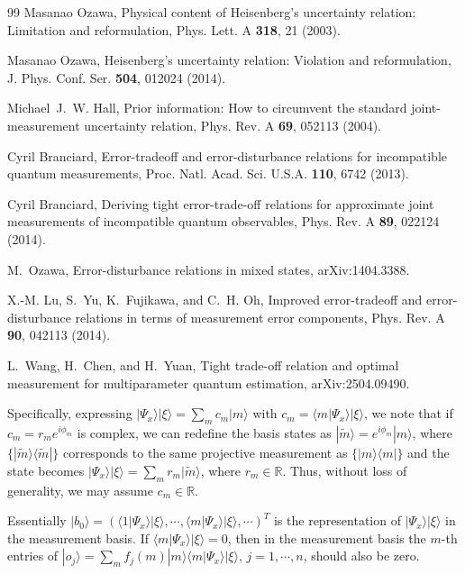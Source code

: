 \documentclass[
aps,
prl,
twocolumn,

superscriptaddress]{revtex4-2}
\newcommand{\ket}[1]{|#1\rangle}
\newcommand{\bra}[1]{\langle #1|}
\begin{document}
\begin{thebibliography}{99}
Masanao Ozawa, Physical content of Heisenberg's uncertainty relation:
Limitation and reformulation, Phys. Lett. A \textbf{318}, 21 (2003).

Masanao Ozawa, Heisenberg's uncertainty relation: Violation and reformulation,
J. Phys. Conf. Ser. \textbf{504}, 012024 (2014).

Michael~J.~W. Hall, Prior information: How to circumvent the standard
joint-measurement uncertainty relation, Phys. Rev. A \textbf{69}, 052113
(2004).

Cyril Branciard, Error-tradeoff and error-disturbance relations for
incompatible quantum measurements, Proc. Natl. Acad. Sci. U.S.A. \textbf{110},
6742 (2013).

Cyril Branciard, Deriving tight error-trade-off relations for approximate joint
measurements of incompatible quantum observables, Phys. Rev. A \textbf{89},
022124 (2014).

M.~Ozawa, Error-disturbance relations in mixed states, arXiv:1404.3388.

X.-M. Lu, S.~Yu, K.~Fujikawa, and C.~H. Oh, Improved error-tradeoff and
error-disturbance relations in terms of measurement error components, Phys.
Rev. A \textbf{90}, 042113 (2014).


L.~Wang, H.~Chen, and H.~Yuan, Tight trade-off relation and optimal measurement
for multiparameter quantum estimation, arXiv:2504.09490.


Specifically, expressing \( |\Psi_x\rangle|\xi\rangle = \sum_m c_m|m\rangle \) with \( c_m = \langle m|\Psi_x\rangle|\xi\rangle \), we note that if \( c_m = r_m e^{i\phi_m} \) is complex, we can redefine the basis states as \( |\tilde{m}\rangle = e^{i\phi_m}|m\rangle \), where $\{\ket{\tilde{m}}\bra{\tilde{m}}\}$ corresponds to the same projective measurement as $\{|m\rangle\langle m|\}$ and the state becomes \( |\Psi_x\rangle|\xi\rangle = \sum_m r_m|\tilde{m}\rangle \), where \( r_m \in \mathbb{R} \). Thus, without loss of generality, we may assume \( c_m \in \mathbb{R} \).

Essentially $|b_0\rangle=(\langle 1|\Psi_x\rangle|\xi\rangle, \cdots, \langle m|\Psi_x\rangle|\xi\rangle, \cdots)^T$ is the representation of $|\Psi_x\rangle|\xi\rangle$ in the measurement basis. If $\langle m|\Psi_x\rangle|\xi\rangle=0$, then in the measurement basis the $m$-th entries of $|o_j\rangle=\sum_m f_j(m)|m\rangle\langle m|\Psi_x\rangle|\xi\rangle$, $j=1,\cdots, n$, should also be zero.



\end{thebibliography}
\end{document}
